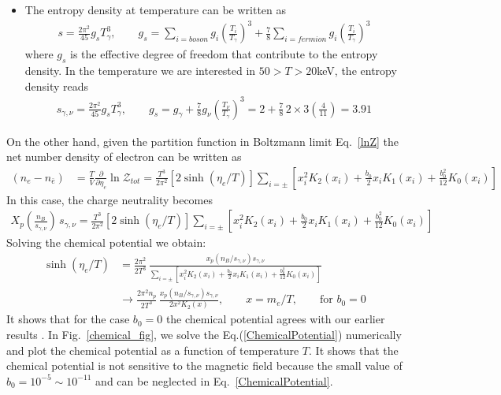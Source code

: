 \documentclass[Universe,article,submit,moreauthors,pdftex]{Definitions/mdpi}
\newcommand*{\req}[1]{Eq.~{\eqref{#1}}}
\newcommand*{\rf}[1]{Fig.~{\ref{#1}}}
\begin{document}
\begin{itemize}
  \item The entropy density at temperature can be written as \cite{Kolb:1990vq}
\begin{align}
s=\frac{2\pi^2}{45}g_sT_\gamma^3,\qquad g_s=\sum_{i=boson}g_i\left(\frac{T_i}{T_\gamma}\right)^3+\frac{7}{8}\sum_{i=fermion}g_i\left(\frac{T_i}{T_\gamma}\right)^3
\end{align}
where $g_s$ is the effective degree of freedom that contribute to the entropy density.  In the temperature we are interested in $50>T>20$keV, the entropy density reads
\begin{align}
s_{\gamma,\nu}=\frac{2\pi^2}{45}g_sT_\gamma^3,\qquad g_s=g_\gamma+\frac{7}{8}g_\nu\left(\frac{T_\nu}{T_\gamma}\right)^3=2+\frac{7}{8}\,2\times3\left(\frac{4}{11}\right)=3.91
\end{align}
\end{itemize}

 
On the other hand, given the partition function in Boltzmann limit \req{lnZ} the net number density of electron can be written as
\begin{align}
\left(n_e-n_{\bar e}\right)&=\frac{T}{V}\frac{\partial}{\partial \eta_{e}}\ln\mathcal{Z}_{tot}=\frac{T^3}{2\pi^2}\left[2\sinh{(\eta_{e}/T)}\right]\sum_{i=\pm}\left[x_i^2K_2(x_i)+\frac{b_0}{2}x_i K_1(x_i)+\frac{b^2_0}{12}K_0(x_i)\right]
\end{align}
In this case, the charge neutrality becomes
\begin{align}
X_p\left(\frac{n_B}{s_{\gamma,\nu}}\right)\,s_{\gamma,\nu}=\frac{T^3}{2\pi^2}\left[2\sinh{(\eta_{e}/T)}\right]\sum_{i=\pm}\left[x_i^2K_2(x_i)+\frac{b_0}{2}x_i K_1(x_i)+\frac{b^2_0}{12}K_0(x_i)\right]
\end{align}
Solving the chemical potential we obtain:
\begin{align}\label{ChemicalPotential}
\sinh{(\eta_{e}/T)}&=\frac{2\pi^2}{2T^3}\,\frac{x_p(n_B/s_{\gamma,\nu})s_{\gamma,\nu}}{\sum_{i=\pm}\left[x_i^2K_2(x_i)+\frac{b_0}{2}x_i K_1(x_i)+\frac{b^2_0}{12}K_0(x_i)\right]}\\
&\longrightarrow\frac{2\pi^2n_p}{2T^3}\,\frac{x_p(n_B/s_{\gamma,\nu})s_{\gamma,\nu}}{2x^2K_2(x)},\qquad x=m_e/T,\qquad \mathrm{for}\,\,b_0=0
\end{align}
It shows that for the case $b_0=0$ the chemical potential agrees with our earlier results \cite{Chris:2023abc}.
In {\rf{chemical_fig}}, we solve the Eq.(\ref{ChemicalPotential}) numerically and plot the  chemical potential as a function of temperature $T$. It shows that the chemical potential is not sensitive to the magnetic field because the small value of $b_0=10^{-5}\sim10^{-11}$ and can be neglected in \req{ChemicalPotential}. 
\end{document}
